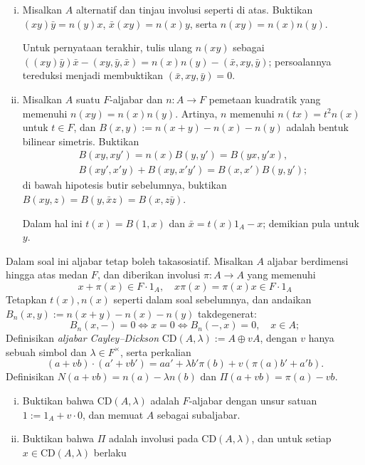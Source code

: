 \begin{Exercises}
\begin{enumerate}[(i)]
			\item Misalkan $A$ alternatif dan tinjau involusi seperti di atas. Buktikan $(xy)\bar{y} = n(y)x$, $\bar{x}(xy) = n(x)y$, serta $n(xy)=n(x)n(y)$.
			\begin{hint} Untuk pernyataan terakhir, tulis ulang $n(xy)$ sebagai $((xy)\bar{y})\bar{x} - (xy, \bar{y}, \bar{x}) = n(x)n(y) - (\bar{x}, xy, \bar{y})$; persoalannya tereduksi menjadi membuktikan $(\bar{x}, xy, \bar{y}) = 0$. \end{hint}
			\item Misalkan $A$ suatu $F$-aljabar dan $n: A \to F$ pemetaan kuadratik yang memenuhi $n(xy)=n(x)n(y)$. Artinya, $n$ memenuhi $n(tx)=t^2 n(x)$ untuk $t \in F$, dan $B(x,y) := n(x+y)-n(x)-n(y)$ adalah bentuk bilinear simetris. Buktikan
				\begin{align*}
					B(xy,xy') = n(x)B(y,y') = B(yx,y'x), \\
					B(xy', x'y) + B(xy, x'y') = B(x,x')B(y,y');
				\end{align*}
				di bawah hipotesis butir sebelumnya, buktikan $B(xy,z) = B(y,\bar{x}z) = B(x, z\bar{y})$. \begin{hint} Dalam hal ini $t(x) = B(1,x)$ dan $\bar{x} = t(x) 1_A - x$; demikian pula untuk $y$.\end{hint}
		\end{enumerate}
	\item Dalam soal ini aljabar tetap boleh takasosiatif. Misalkan $A$ aljabar berdimensi hingga atas medan $F$, dan diberikan involusi $\pi: A \to A$ yang memenuhi
		\[ x + \pi(x) \in F \cdot 1_A, \quad x\pi(x) = \pi(x) x \in F \cdot 1_A \]
		Tetapkan $t(x), n(x)$ seperti dalam soal sebelumnya, dan andaikan $B_n(x,y) := n(x+y) - n(x) - n(y)$ takdegenerat:
		\[ B_n(x,-) = 0 \iff x = 0 \iff B_n(-,x)=0, \quad x \in A; \]
		Definisikan \emph{aljabar Cayley--Dickson} $\text{CD}(A, \lambda) := A \oplus vA$, dengan $v$ hanya sebuah simbol dan $\lambda \in F^{\times}$, serta perkalian
		\[ (a + vb) \cdot (a' + vb') = aa' + \lambda b' \pi(b) + v \left( \pi(a)b' + a'b \right). \]
		Definisikan $N(a+vb) = n(a) - \lambda n(b)$ dan $\Pi(a+vb) = \pi(a) - vb$.
		\begin{enumerate}[(i)]
			\item Buktikan bahwa $\text{CD}(A, \lambda)$ adalah $F$-aljabar dengan unsur satuan $1 := 1_A + v \cdot 0$, dan memuat $A$ sebagai subaljabar.
			\item Buktikan bahwa $\Pi$ adalah involusi pada $\text{CD}(A, \lambda)$, dan untuk setiap $x \in \text{CD}(A, \lambda)$ berlaku
				\begin{gather*}

\end{gather*}
\end{enumerate}
\end{Exercises}

